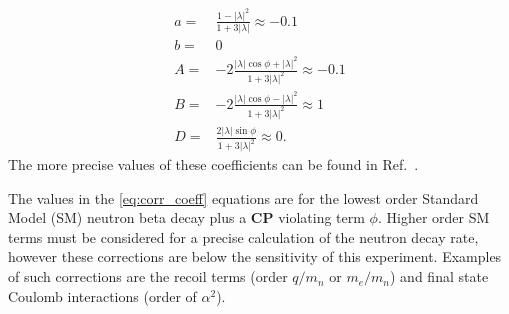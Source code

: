 \documentclass[oneside,12pt]{memoir}
\begin{document}
\begin{subequations}
\label{eq:corr_coeff}
\begin{align}
	a = & \frac{1-\left|\lambda\right|^2}{1+3\left|\lambda\right|}
		\approx -0.1\\
	b = & 0 \\
	A = & -2\frac{\left|\lambda\right|\cos \phi+\left|\lambda\right|^2}{1+3\left|\lambda\right|^2}
		\approx -0.1 \\
	B = & -2\frac{\left|\lambda\right|\cos \phi - 
		\left|\lambda\right|^2}{1+3\left|\lambda\right|^2}
		\approx 1 \\
	D = & \frac{2\left|\lambda\right|\sin\phi}
		{1+3\left|\lambda\right|^2}\approx 0.
\end{align}
\end{subequations}
The more precise values of these coefficients can be found in Ref.~\cite{Amsler20081}.\par
The values in the \ref{eq:corr_coeff} equations are for the lowest order Standard Model (SM) neutron beta decay plus a $\mathbf{CP}$ violating term $\phi$. Higher order SM terms must be considered for a precise calculation of the neutron decay rate, however these corrections are below the sensitivity of this experiment. Examples of such corrections are the recoil terms (order $q/m_n$ or $m_e/m_n$) and final state Coulomb interactions (order of $\alpha^2$).
\end{document}
